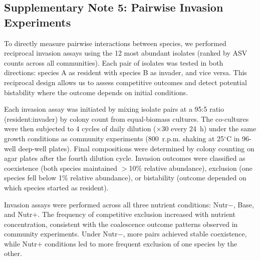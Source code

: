 \subsection*{Supplementary Note 5: Pairwise Invasion Experiments}
\label{sec:suppl:note5}

To directly measure pairwise interactions between species, we performed reciprocal invasion assays using the 12 most abundant isolates (ranked by ASV counts across all communities). Each pair of isolates was tested in both directions: species A as resident with species B as invader, and vice versa. This reciprocal design allows us to assess competitive outcomes and detect potential bistability where the outcome depends on initial conditions.

Each invasion assay was initiated by mixing isolate pairs at a 95:5 ratio (resident:invader) by colony count from equal-biomass cultures. The co-cultures were then subjected to 4 cycles of daily dilution ($\times$30 every 24~h) under the same growth conditions as community experiments (800~r.p.m. shaking at 25$^\circ$C in 96-well deep-well plates). Final compositions were determined by colony counting on agar plates after the fourth dilution cycle. Invasion outcomes were classified as coexistence (both species maintained $>$10\% relative abundance), exclusion (one species fell below 1\% relative abundance), or bistability (outcome depended on which species started as resident).

Invasion assays were performed across all three nutrient conditions: Nutr$-$, Base, and Nutr$+$. The frequency of competitive exclusion increased with nutrient concentration, consistent with the coalescence outcome patterns observed in community experiments. Under Nutr$-$, more pairs achieved stable coexistence, while Nutr$+$ conditions led to more frequent exclusion of one species by the other.

